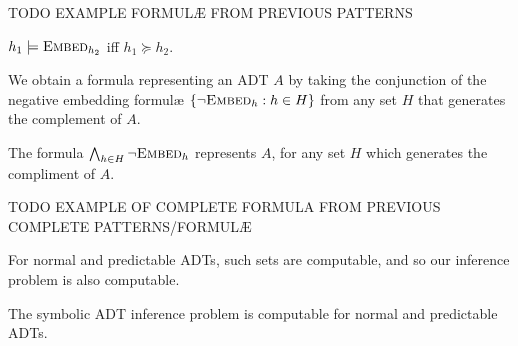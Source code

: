 \begin{example}

  TODO EXAMPLE FORMULÆ FROM PREVIOUS PATTERNS

\end{example}

\begin{lemma}

  $h_1 \models \textsc{Embed}_{h_2}$ if{f} $h_1 \succeq h_2$.

\end{lemma}

We obtain a formula representing an ADT $A$ by taking the conjunction of the
negative embedding formulæ ${\{{ \lnot\textsc{Embed}_h : h \in H }\}}$ from any
set $H$ that generates the complement of $A$.

\begin{lemma}

  The formula $\bigwedge_{h \in H} \neg \textsc{Embed}_h$ represents $A$,
  for any set $H$ which generates the compliment of $A$.

\end{lemma}

\begin{example}

  TODO EXAMPLE OF COMPLETE FORMULA FROM PREVIOUS COMPLETE PATTERNS/FORMULÆ
  
\end{example}

For normal and predictable ADTs, such sets are computable, and so our inference
problem is also computable.

\begin{theorem}

  The symbolic ADT inference problem is computable for normal and predictable ADTs.

\end{theorem}
